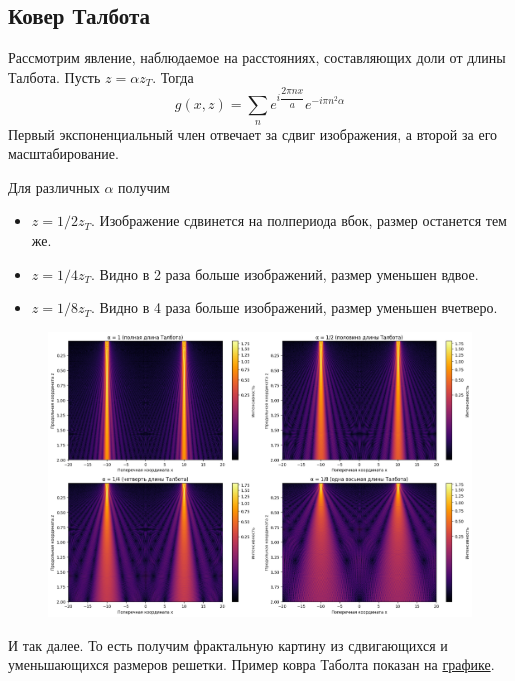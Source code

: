 \subsection{Ковер Талбота}
Рассмотрим явление, наблюдаемое на расстояниях, составляющих доли от длины Талбота. Пусть $z = \alpha z_T$. Тогда
\[
g(x, z) = \sum\limits_n e^{i\dfrac{2\pi n x}{a}}e^{-i\pi n^2\alpha}
\]
Первый экспоненциальный член отвечает за сдвиг изображения, а второй за его масштабирование.

Для различных $\alpha$ получим
\begin{itemize}
    \item $z = 1/2 z_T$. Изображение сдвинется на полпериода вбок, размер останется тем же.
    \item $z = 1/4 z_T$. Видно в 2 раза больше изображений, размер уменьшен вдвое.
    \item $z = 1/8 z_T$. Видно в 4 раза больше изображений, размер уменьшен вчетверо.
\end{itemize}

\begin{figure}[H]
    \centering
    \includegraphics[width=1\linewidth]{images/распределение интенсивности.png}
    \label{I}
\end{figure}


И так далее. То есть получим фрактальную картину из сдвигающихся и уменьшающихся размеров решетки. Пример ковра Таболта показан на \hyperref[]{графике}.\\


